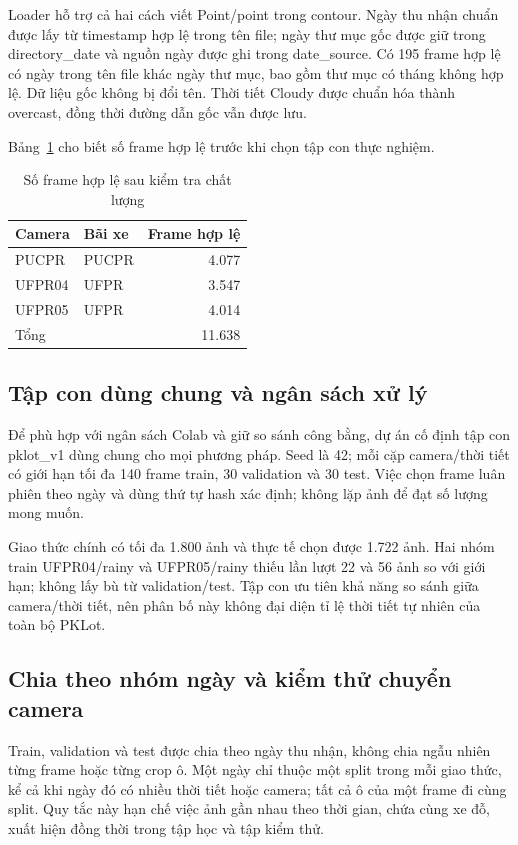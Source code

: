 Loader hỗ trợ cả hai cách viết Point/point trong contour. Ngày thu nhận chuẩn được lấy từ timestamp hợp lệ trong tên file; ngày thư mục gốc được giữ trong directory\_date và nguồn ngày được ghi trong date\_source. Có 195 frame hợp lệ có ngày trong tên file khác ngày thư mục, bao gồm thư mục có tháng không hợp lệ. Dữ liệu gốc không bị đổi tên. Thời tiết Cloudy được chuẩn hóa thành overcast, đồng thời đường dẫn gốc vẫn được lưu.

Bảng~\ref{tab:valid-data} cho biết số frame hợp lệ trước khi chọn tập con thực nghiệm.

\begin{table}[htbp]
\centering
\caption{Số frame hợp lệ sau kiểm tra chất lượng}
\label{tab:valid-data}
\begin{tabular}{llr}
\toprule
Camera & Bãi xe & Frame hợp lệ \\
\midrule
PUCPR & PUCPR & 4.077 \\
UFPR04 & UFPR & 3.547 \\
UFPR05 & UFPR & 4.014 \\
Tổng &  & 11.638 \\
\bottomrule
\end{tabular}
\end{table}

\subsection{Tập con dùng chung và ngân sách xử lý}
Để phù hợp với ngân sách Colab và giữ so sánh công bằng, dự án cố định tập con pklot\_v1 dùng chung cho mọi phương pháp. Seed là 42; mỗi cặp camera/thời tiết có giới hạn tối đa 140 frame train, 30 validation và 30 test. Việc chọn frame luân phiên theo ngày và dùng thứ tự hash xác định; không lặp ảnh để đạt số lượng mong muốn.

Giao thức chính có tối đa 1.800 ảnh và thực tế chọn được 1.722 ảnh. Hai nhóm train UFPR04/rainy và UFPR05/rainy thiếu lần lượt 22 và 56 ảnh so với giới hạn; không lấy bù từ validation/test. Tập con ưu tiên khả năng so sánh giữa camera/thời tiết, nên phân bố này không đại diện tỉ lệ thời tiết tự nhiên của toàn bộ PKLot.

\subsection{Chia theo nhóm ngày và kiểm thử chuyển camera}
Train, validation và test được chia theo ngày thu nhận, không chia ngẫu nhiên từng frame hoặc từng crop ô. Một ngày chỉ thuộc một split trong mỗi giao thức, kể cả khi ngày đó có nhiều thời tiết hoặc camera; tất cả ô của một frame đi cùng split. Quy tắc này hạn chế việc ảnh gần nhau theo thời gian, chứa cùng xe đỗ, xuất hiện đồng thời trong tập học và tập kiểm thử.

